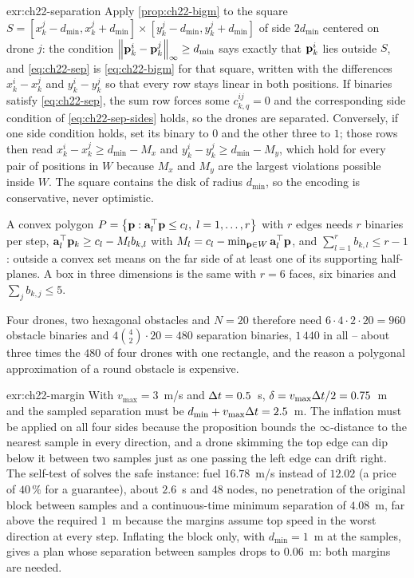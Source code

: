 \begin{solution}{exr:ch22-separation}
Apply \cref{prop:ch22-bigm} to the square
$S = [x^j_k - d_{\min}, x^j_k + d_{\min}] \times [y^j_k - d_{\min},
y^j_k + d_{\min}]$ of side $2 d_{\min}$ centered on drone $j$: the
condition $\left\lVert \mathbf{p}^i_k - \mathbf{p}^j_k \right\rVert_\infty \ge d_{\min}$ says exactly
that $\mathbf{p}^i_k$ lies outside $S$, and \cref{eq:ch22-sep} is
\cref{eq:ch22-bigm} for that square, written with the differences
$x^i_k - x^j_k$ and $y^i_k - y^j_k$ so that every row stays linear in both
positions. If binaries satisfy \cref{eq:ch22-sep}, the sum row forces some
$c^{ij}_{k,q} = 0$ and the corresponding side condition of
\cref{eq:ch22-sep-sides} holds, so the drones are separated. Conversely,
if one side condition holds, set its binary to $0$ and the other three to
$1$; those rows then read $x^i_k - x^j_k \ge d_{\min} - M_x$ and
$y^i_k - y^j_k \ge d_{\min} - M_y$, which hold for every pair of positions
in $W$ because $M_x$ and $M_y$ are the largest violations possible inside
$W$. The square contains the disk of radius $d_{\min}$, so the encoding is
conservative, never optimistic.

A convex polygon $P = \left\{ \mathbf{p} : \mathbf{a}_l^\top \mathbf{p} \le c_l,\;
l = 1, \dots, r \right\}$ with $r$ edges needs $r$ binaries per step,
$\mathbf{a}_l^\top \mathbf{p}_k \ge c_l - M_l b_{k,l}$ with
$M_l = c_l - \min_{\mathbf{p} \in W} \mathbf{a}_l^\top \mathbf{p}$, and
$\sum_{l=1}^{r} b_{k,l} \le r - 1$: outside a convex set means on the far
side of at least one of its supporting half-planes. A box in three
dimensions is the same with $r = 6$ faces, six binaries and
$\sum_j b_{k,j} \le 5$.

Four drones, two hexagonal obstacles and $N = 20$ therefore need
$6 \cdot 4 \cdot 2 \cdot 20 = 960$ obstacle binaries and
$4 \binom{4}{2} \cdot 20 = 480$ separation binaries, $1\,440$ in all --
about three times the $480$ of four drones with one rectangle, and the
reason a polygonal approximation of a round obstacle is expensive.
\end{solution}

\begin{solution}{exr:ch22-margin}
With $v_{\max} = 3$~m/s and $\Delta t = 0.5$~s, $\delta = v_{\max}\Delta t/2 =
0.75$~m and the sampled separation must be $d_{\min} + v_{\max}\Delta t =
2.5$~m. The inflation must be applied on all four sides because the
proposition bounds the $\infty$-distance to the nearest sample in every
direction, and a drone skimming the top edge can dip below it between two
samples just as one passing the left edge can drift right. The self-test
of  solves the safe instance: fuel $16.78$~m/s instead
of $12.02$ (a price of $40\,\%$ for a guarantee), about $2.6$~s and $48$
nodes, no penetration of the original block between samples and a
continuous-time minimum separation of $4.08$~m, far above the required
$1$~m because the margins assume top speed in the worst direction at every
step. Inflating the block only, with $d_{\min} = 1$~m at the samples, gives
a plan whose separation between samples drops to $0.06$~m: both margins
are needed.
\end{solution}

